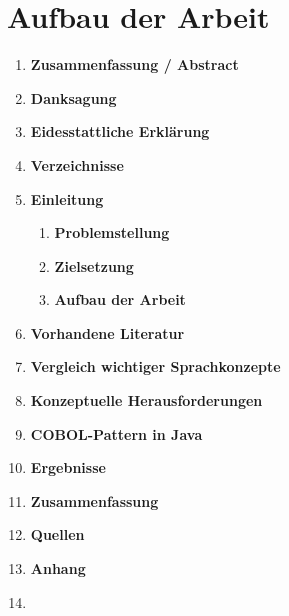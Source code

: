 \section{Aufbau der Arbeit}

\begin{framed}
\begin{enumerate}[label=\arabic*.]
    \item[] \textbf{Zusammenfassung / Abstract}

    \item[] \textbf{Danksagung}

    \item[] \textbf{Eidesstattliche Erklärung}

    \item[] \textbf{Verzeichnisse}

    \item   \textbf{Einleitung}      
        \begin{enumerate}[label=\arabic*.]
            \item \textbf{Problemstellung}
            \item \textbf{Zielsetzung}
            \item \textbf{Aufbau der Arbeit}
        \end{enumerate}

    \item   \textbf{Vorhandene Literatur}
    
    \item   \textbf{Vergleich wichtiger Sprachkonzepte}
    
    \item   \textbf{Konzeptuelle Herausforderungen}

    \item   \textbf{COBOL-Pattern in Java}
    
    \item   \textbf{Ergebnisse}
    
    \item   \textbf{Zusammenfassung}
    
    \item[] \textbf{Quellen}
    
    \item[] \textbf{Anhang}
    
    \item[]
\end{enumerate}
\end{framed}